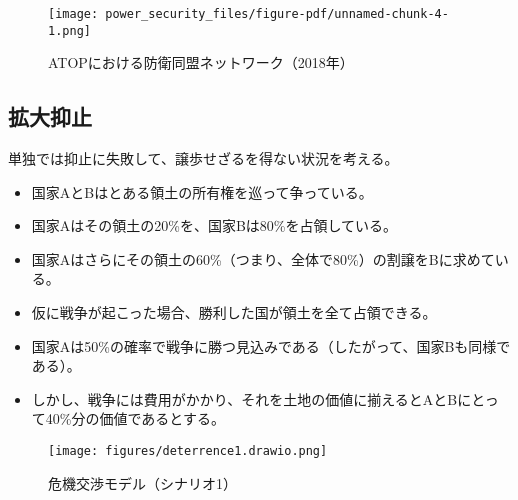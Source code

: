\documentclass[
  xelatex,
  ja=standard]{bxjsarticle}
\providecommand{\tightlist}{%
  \setlength{\itemsep}{0pt}\setlength{\parskip}{0pt}}\usepackage{longtable,booktabs,array}
\begin{document}
\begin{figure}[htpb]

{\centering \texttt{[image: power\_security\_files/figure-pdf/unnamed-chunk-4-1.png]}

}

\caption{ATOPにおける防衛同盟ネットワーク（2018年）}

\end{figure}

\hypertarget{ux62e1ux5927ux6291ux6b62}{%
\subsection{拡大抑止}\label{ux62e1ux5927ux6291ux6b62}}

単独では抑止に失敗して、譲歩せざるを得ない状況を考える。

\begin{tcolorbox}[enhanced jigsaw, opacityback=0, leftrule=.75mm, toptitle=1mm, colframe=quarto-callout-tip-color-frame, arc=.35mm, bottomrule=.15mm, coltitle=black, bottomtitle=1mm, colbacktitle=quarto-callout-tip-color!10!white, titlerule=0mm, breakable, title=\textcolor{quarto-callout-tip-color}{\faLightbulb}\hspace{0.5em}{国際危機のシナリオ1}, left=2mm, rightrule=.15mm, toprule=.15mm, opacitybacktitle=0.6, colback=white]

\begin{itemize}
\tightlist
\item
  国家AとBはとある領土の所有権を巡って争っている。
\item
  国家Aはその領土の20\%を、国家Bは80\%を占領している。
\item
  国家Aはさらにその領土の60\%（つまり、全体で80\%）の割譲をBに求めている。
\item
  仮に戦争が起こった場合、勝利した国が領土を全て占領できる。
\item
  国家Aは50\%の確率で戦争に勝つ見込みである（したがって、国家Bも同様である）。
\item
  しかし、戦争には費用がかかり、それを土地の価値に揃えるとAとBにとって40\%分の価値であるとする。
\end{itemize}

\end{tcolorbox}

\begin{figure}[htpb]

{\centering \texttt{[image: figures/deterrence1.drawio.png]}

}

\caption{危機交渉モデル（シナリオ1）}

\end{figure}
\end{document}
